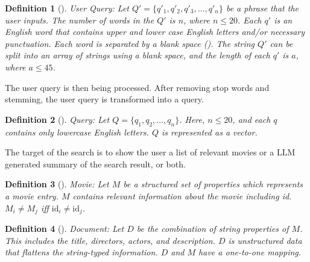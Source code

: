 \documentclass[journal]{IEEEtran}
\theoremstyle{mydefstyle}
\newtheorem{definition}{Definition}[section]
\begin{document}
\begin{adjustwidth}{0.75cm}{}
\begin{definition}[]
    \textit{User Query:} Let \( Q' = \{q'_1, q'_2, q'_3, \ldots, q'_n\} \) be a phrase that the user inputs. The number of words in the \( Q' \) is \( n \), where \( n \leq 20 \). Each \( q' \) is an English word that contains upper and lower case English letters and/or necessary punctuation. Each word is separated by a blank space (\textvisiblespace). The string \( Q' \) can be split into an array of strings using a blank space, and the length of each \( q' \) is \( a \), where \( a \leq 45 \).

\end{definition}
\end{adjustwidth}

\vspace{10pt} 

The user query is then being processed. After removing stop words and stemming, the user query is transformed into a query.

\begin{adjustwidth}{0.75cm}{} \begin{definition}[]
\textit{Query:} Let \( Q = \{q_1, q_2, \ldots, q_n\} \). Here, \( n \leq 20 \), and each \( q \) contains only lowercase English letters. \( Q \) is represented as a vector.
\end{definition} \end{adjustwidth}

\vspace{10pt} 

The target of the search is to show the user a list of relevant movies or a LLM generated summary of the search result, or both. 

\begin{adjustwidth}{0.75cm}{} \begin{definition}[]
\textit{Movie:} Let \( M \) be a structured set of properties which represents a movie entry. \( M \) contains relevant information about the movie including id. \( M_i \neq M_j \) iff \( \text{id}_i \neq \text{id}_j \).
\end{definition} \end{adjustwidth}

\begin{adjustwidth}{0.75cm}{} \begin{definition}[]
\textit{Document:} Let \( D \) be the combination of string properties of \( M \). This includes the title, directors, actors, and description. \( D \) is unstructured data that flattens the string-typed information. \( D \) and \( M \) have a one-to-one mapping.
\end{definition} \end{adjustwidth}
\end{document}
